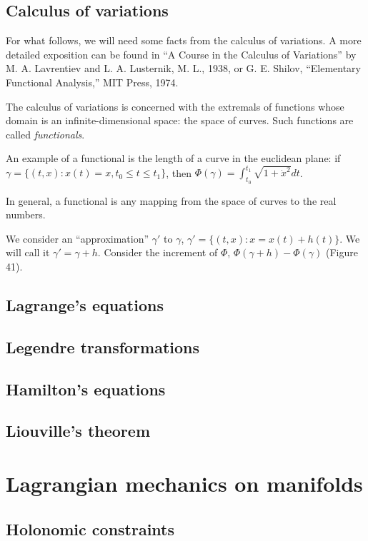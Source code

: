 \documentclass[leqno]{book}
\numberwithin{equation}{section}
\theoremstyle{plain}
\theoremstyle{definition}
\theoremstyle{remark}
\theoremstyle{smallcap}
\numberwithin{prob}{section}
\begin{document}
\section{Calculus of variations}

For what follows, we will need some facts from the calculus of variations.
%
A more detailed exposition can be found in
``A Course in the Calculus of Variations''
by M. A. Lavrentiev and L. A. Lusternik, M. L., 1938,
or
G. E. Shilov, ``Elementary Functional Analysis,''
MIT Press, 1974.


The calculus of variations is concerned with the extremals of
functions whose domain is an infinite-dimensional space:
the space of curves.
%
Such functions are called \emph{functionals}.

An example of a functional is the length of a curve in the euclidean plane:
if $\gamma = \{(t, x): x(t) = x,  t_0 \le t \le t_1 \}$,
then $\Phi(\gamma) = \int_{t_0}^{t_1} \sqrt{1 + {\dot x}^2 } dt$.

In general, a functional is any mapping from the space of curves
to the real numbers.

We consider an ``approximation'' $\gamma'$ to $\gamma$,
$\gamma' = \{(t, x): x = x(t) + h(t)\}$.
%
We will call it $\gamma' = \gamma + h$.
Consider the increment of $\Phi$,
$\Phi(\gamma + h) - \Phi(\gamma)$
(Figure 41).

\section{Lagrange's equations}

\section{Legendre transformations}

\section{Hamilton's equations}

\section{Liouville's theorem}

\chapter{Lagrangian mechanics on manifolds}

\section{Holonomic constraints}
\end{document}
